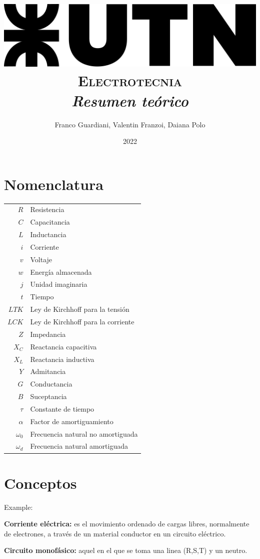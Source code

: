 \documentclass[11pt,a4paper,twocolumn]{article}
\author{Franco Guardiani, Valentin Franzoi, Daiana Polo}
\title{\includegraphics[width=.3\textwidth]{utn} \\ \textsc{Electrotecnia} \\ \textsl{Resumen teórico} \\ }
\date{2022}
\begin{document}
	\pagestyle{fancy}
	\maketitle
	\section*{Nomenclatura}
	\begin{tabular}{r l}
		$R$ & Resistencia \\
		$C$ & Capacitancia \\
		$L$ & Inductancia \\
		$i$ & Corriente \\
		$v$ & Voltaje \\
		$w$ & Energía almacenada \\
		$j$ & Unidad imaginaria \\
		$t$ & Tiempo \\
		$LTK$ & Ley de Kirchhoff para la tensión \\
		$LCK$ & Ley de Kirchhoff para la corriente \\
		$Z$ & Impedancia \\
		$X_{C}$ & Reactancia capacitiva \\
		$X_{L}$ & Reactancia inductiva \\
		$Y$ & Admitancia\\
		$G$& Conductancia\\
		$B$ & Suceptancia\\
		$\tau$ & Constante de tiempo \\
		$\alpha$ & Factor de amortiguamiento \\
		$\omega_{0}$ & Frecuencia natural no amortiguada \\
		$\omega_{d}$ & Frecuencia natural amortiguada \\
		
		
		
	\end{tabular}
	
	\newpage
	
	\section*{Conceptos}
	
	Example: 
	
	\textbf{Corriente eléctrica:} es el movimiento ordenado de cargas libres, normalmente de electrones, a través de un material conductor en un circuito eléctrico.
	
	\textbf{Circuito monofásico:} aquel en el que se toma una linea (R,S,T) y un neutro.
	
\end{document}
